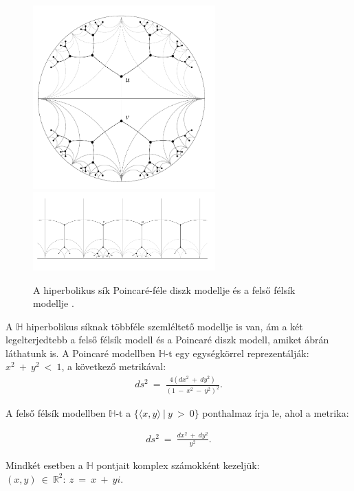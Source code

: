   \begin{figure}[h]
    \centering
    \includegraphics[width=70mm]{./figures/3-reg_disk.png}\hspace{5mm}
    \includegraphics[width=70mm,keepaspectratio=true]{./figures/3-reg_half_plane.png}

    \caption{A hiperbolikus sík Poincaré-féle diszk modellje és a felső félsík modellje \cite{Klein07}.}
    \label{fig:figure_hiperbolikusabrak}
  \end{figure}

  A $\mathbb{H}$ hiperbolikus síknak többféle szemléltető modellje is van, ám a két legelterjedtebb a felső félsík modell és a Poincaré diszk modell, amiket  ábrán láthatunk is. A Poincaré modellben $\mathbb{H}$-t egy egységkörrel reprezentálják: $x^2~+~y^2~<~1$, a következő metrikával:
  \begin{align}
  ds^2~=~\frac{4(dx^2~+~dy^2)}{(1~-~x^2~-~y^2)^2}.
  \end{align}

  A felső félsík modellben $\mathbb{H}$-t a $\{\langle x,y\rangle ~|~y~>~0\}$ ponthalmaz írja le, ahol a metrika:

  \begin{align}
  ds^2~=~\frac{dx^2~+~dy^2}{y^2}.
  \end{align}

  Mindkét esetben a $\mathbb{H}$ pontjait komplex számokként kezeljük: $(x,y)~\in~\mathbb{R}^2:~z~=~x~+~yi$.

